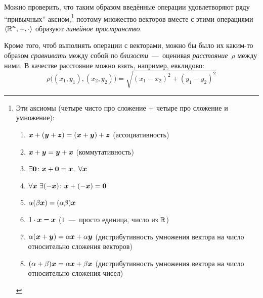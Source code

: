 \documentclass[a4paper,12pt]{article}
\begin{document}
  Можно проверить, что таким образом введённые операции удовлетворяют ряду ``привычных'' аксиом,\footnote{
    Эти аксиомы (четыре чисто про сложение + четыре про сложение и умножение):
    \begin{enumerate}
      \item $\boldsymbol x + (\boldsymbol y + \boldsymbol z) = (\boldsymbol x + \boldsymbol y) + \boldsymbol z$ (ассоциативность)
      \item $\boldsymbol x + \boldsymbol y = \boldsymbol y + \boldsymbol x$ (коммутативность)
      \item $\exists \boldsymbol 0\colon \boldsymbol x + \boldsymbol 0 = \boldsymbol x,\ \forall \boldsymbol x$
      \item $\forall \boldsymbol x\ \exists (-\boldsymbol x)\colon \boldsymbol x + (-\boldsymbol x) = \boldsymbol 0$
      \item $\alpha (\beta \boldsymbol x) = (\alpha \beta) \boldsymbol x$
      \item $1 \cdot \boldsymbol x = \boldsymbol x$ ($1$~---~просто единица, число из $\operatorname{\mathbb R}$)
      \item $\alpha (\boldsymbol x + \boldsymbol y) = \alpha \boldsymbol x + \alpha \boldsymbol y$ (дистрибутивность умножения вектора на число относительно сложения векторов)
      \item $(\alpha + \beta) \boldsymbol x = \alpha \boldsymbol x + \beta \boldsymbol x$ (дистрибутивность умножения вектора на число относительно сложения чисел)
    \end{enumerate}
  } поэтому множество векторов вместе с этими операциями $\langle\operatorname{\mathbb R}^n, +, \cdot\rangle$ образуют \emph{линейное пространство}.

  Кроме того, чтоб выполнять операции с векторами, можно бы было их каким-то образом \emph{сравнивать} между собой по \emph{близости}~---~оценивая \emph{расстояние}~$\rho$ между ними.
  В качестве расстояние можно взять, например, евклидово:
  \[
    \rho\bigl((x_1, y_1), (x_2, y_2)\bigr) = \sqrt{(x_1 - x_2)^2 + (y_1 - y_2)^2}
  \]
\end{document}
